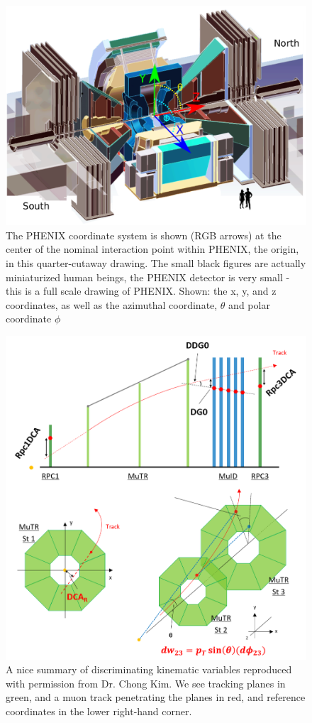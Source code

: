 \begin{figure}
  \centering
  \includegraphics[width=\linewidth]{./figures/phenix_coordinate_system.png}
  \caption{
    The PHENIX coordinate system is shown (RGB arrows) at the center of the
    nominal interaction point within PHENIX, the origin, in this quarter-cutaway
    drawing. The small black figures are actually miniaturized human beings, the
    PHENIX detector is very small - this is a full scale drawing of PHENIX.
    Shown: the x, y, and z coordinates, as well as the azimuthal coordinate,
    $\theta$ and polar coordinate $\phi$ ~\cite{WebPHENIXDrawings}
  }
  \label{fig:phenix_coordinate_system}

\end{figure}


\begin{figure}
  \centering
  \includegraphics[width=0.8\linewidth]{./figures/kinematic_variables_schematic.png}
  \caption{
    A nice summary of discriminating kinematic variables reproduced with
    permission from Dr. Chong Kim. We see tracking planes in green, and a muon
    track penetrating the planes in red, and reference coordinates in the lower
    right-hand corner.
  }

\end{figure}

